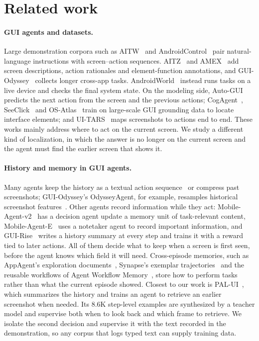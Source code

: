 \section{Related work}
\paragraph{GUI agents and datasets.} Large demonstration corpora such as AITW~\citep{aitw} and AndroidControl~\citep{androidcontrol} pair natural-language instructions with screen--action sequences. AITZ~\citep{aitz} and AMEX~\citep{amex} add screen descriptions, action rationales and element-function annotations, and GUI-Odyssey~\citep{odysseypub} collects longer cross-app tasks. AndroidWorld~\citep{androidworld} instead runs tasks on a live device and checks the final system state. On the modeling side, Auto-GUI~\citep{autogui} predicts the next action from the screen and the previous actions; CogAgent~\citep{cogagent}, SeeClick~\citep{seeclick} and OS-Atlas~\citep{osatlas} train on large-scale GUI grounding data to locate interface elements; and UI-TARS~\citep{uitars} maps screenshots to actions end to end. These works mainly address where to act on the current screen. We study a different kind of localization, in which the answer is no longer on the current screen and the agent must find the earlier screen that shows it.

\paragraph{History and memory in GUI agents.} Many agents keep the history as a textual action sequence~\citep{autogui} or compress past screenshots; GUI-Odyssey's OdysseyAgent, for example, resamples historical screenshot features~\citep{odysseypub}. Other agents record information while they act: Mobile-Agent-v2~\citep{mobileagentv2} has a decision agent update a memory unit of task-relevant content, Mobile-Agent-E~\citep{mobileagente} uses a notetaker agent to record important information, and GUI-Rise~\citep{guirise} writes a history summary at every step and trains it with a reward tied to later actions. All of them decide what to keep when a screen is first seen, before the agent knows which field it will need. Cross-episode memories, such as AppAgent's exploration documents~\citep{appagent}, Synapse's exemplar trajectories~\citep{synapse} and the reusable workflows of Agent Workflow Memory~\citep{awm}, store how to perform tasks rather than what the current episode showed. Closest to our work is PAL-UI~\citep{palui}, which summarizes the history and trains an agent to retrieve an earlier screenshot when needed. Its 8.6K step-level examples are synthesized by a teacher model and supervise both when to look back and which frame to retrieve. We isolate the second decision and supervise it with the text recorded in the demonstration, so any corpus that logs typed text can supply training data.

